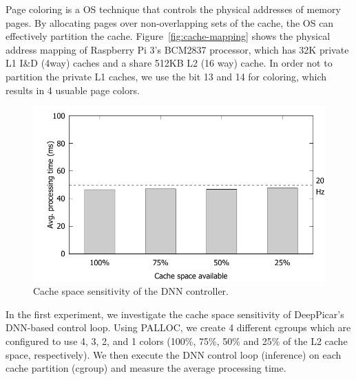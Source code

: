 Page coloring is a OS technique that controls the physical addresses
of memory pages. By allocating pages over non-overlapping sets of the
cache, the OS can effectively partition the cache.
Figure~\ref{fig:cache-mapping} shows the physical address
mapping of Raspberry Pi 3's BCM2837 processor, which has 32K private
L1 I\&D (4way) caches and a share 512KB L2 (16 way) cache. In order not
to partition the private L1 caches, we use the bit 13 and 14 for
coloring, which results in 4 usuable page colors.



\begin{figure}[h]
  \centering
  \includegraphics[width=.45\textwidth]{figs/palloc_multicore}
  \caption{Cache space sensitivity of the DNN controller.}
  \label{fig:palloc_multicore}
\end{figure}

In the first experiment, we investigate the cache space sensitivity of
DeepPicar's DNN-based control loop. Using PALLOC, we create 4
different cgroups which are configured to use 4, 3,
2, and 1 colors (100\%, 75\%, 50\% and 25\% of the L2 cache
space, respectively). We then execute the DNN control loop (inference)
on each cache partition (cgroup) and measure the average processing
time.


